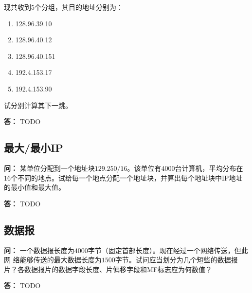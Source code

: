 \documentclass[12pt,hyperref,a4paper,UTF8]{ctexart}
\begin{document}
现共收到5个分组，其目的地址分别为：
\begin{enumerate}[label=(\arabic*),leftmargin=2.2\parindent]
    \item 128.96.39.10
    \item 128.96.40.12
    \item 128.96.40.151
    \item 192.4.153.17
    \item 192.4.153.90
\end{enumerate}

试分别计算其下一跳。

\textbf{答：}
TODO

\subsection{最大/最小IP}
\textbf{问：}
某单位分配到一个地址块$129.250/16$。该单位有$4000$台计算机，平均分布在$16$个不同的地点。试给每一个地点分配一个地址块，并算出每个地址块中IP地址的最小值和最大值。

\textbf{答：}
TODO

\subsection{数据报}
\textbf{问：}
一个数据报长度为$4000$字节（固定首部长度）。现在经过一个网络传送，但此网
络能够传送的最大数据长度为$1500$字节。试问应当划分为几个短些的数据报片？各数据报片的数据字段长度、片偏移字段和MF标志应为何数值？

\textbf{答：}
TODO
\end{document}
